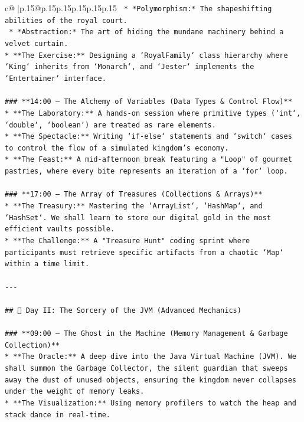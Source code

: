 \documentclass{article}
\begin{document}
{\begin{supertabular}{c@{$\;$}|p{.15\linewidth}@{}p{.15\linewidth}p{.15\linewidth}p{.15\linewidth}p{.15\linewidth}p{.15\linewidth}}
{{{\texttt{    *   *Polymorphism:* The shapeshifting abilities of the royal court.} \\
\texttt{    *   *Abstraction:* The art of hiding the mundane machinery behind a velvet curtain.} \\
\texttt{*   **The Exercise:** Designing a `RoyalFamily` class hierarchy where `King` inherits from `Monarch`, and `Jester` implements the `Entertainer` interface.} \\
\\ 
\texttt{\#\#\# **14:00 – The Alchemy of Variables (Data Types \& Control Flow)**} \\
\texttt{*   **The Laboratory:** A hands{-}on session where primitive types (`int`, `double`, `boolean`) are treated as rare elements.} \\
\texttt{*   **The Spectacle:** Writing `if{-}else` statements and `switch` cases to control the flow of a simulated kingdom's economy.} \\
\texttt{*   **The Feast:** A mid{-}afternoon break featuring a "Loop" of gourmet pastries, where every bite represents an iteration of a `for` loop.} \\
\\ 
\texttt{\#\#\# **17:00 – The Array of Treasures (Collections \& Arrays)**} \\
\texttt{*   **The Treasury:** Mastering the `ArrayList`, `HashMap`, and `HashSet`. We shall learn to store our digital gold in the most efficient vaults possible.} \\
\texttt{*   **The Challenge:** A "Treasure Hunt" coding sprint where participants must retrieve specific artifacts from a chaotic `Map` within a time limit.} \\
\\ 
\texttt{{-}{-}{-}} \\
\\ 
\texttt{\#\# 🌇 Day II: The Sorcery of the JVM (Advanced Mechanics)} \\
\\ 
\texttt{\#\#\# **09:00 – The Ghost in the Machine (Memory Management \& Garbage Collection)**} \\
\texttt{*   **The Oracle:** A deep dive into the Java Virtual Machine (JVM). We shall summon the Garbage Collector, the silent guardian that sweeps away the dust of unused objects, ensuring the kingdom never collapses under the weight of memory leaks.} \\
\texttt{*   **The Visualization:** Using memory profilers to watch the heap and stack dance in real{-}time.} \\
}}}
\end{supertabular}}
\end{document}
